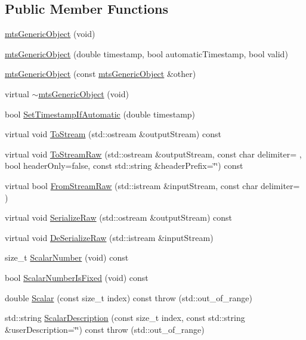 \subsection*{Public Member Functions}
\begin{DoxyCompactItemize}
\item 
\hyperlink{classmts_generic_object_a8db6fa82ec6526194414c4c8bd9dee74}{mts\+Generic\+Object} (void)
\item 
\hyperlink{classmts_generic_object_a70bddbc580e56e7e127263febcad2ed8}{mts\+Generic\+Object} (double timestamp, bool automatic\+Timestamp, bool valid)
\item 
\hyperlink{classmts_generic_object_ade9d524eb6dc7ec1ec2507f91686442c}{mts\+Generic\+Object} (const \hyperlink{classmts_generic_object}{mts\+Generic\+Object} \&other)
\item 
virtual \hyperlink{classmts_generic_object_a1180fc7069c6f241f9be8449d45363d6}{$\sim$mts\+Generic\+Object} (void)
\item 
bool \hyperlink{classmts_generic_object_ad935c5369d451e6ce2ad17a08222bdcc}{Set\+Timestamp\+If\+Automatic} (double timestamp)
\item 
virtual void \hyperlink{classmts_generic_object_a2030aaa58bc215eccce1dc8d20dd0fdc}{To\+Stream} (std\+::ostream \&output\+Stream) const 
\item 
virtual void \hyperlink{classmts_generic_object_a4916a6c62ee5b167d7c93c88ab72523a}{To\+Stream\+Raw} (std\+::ostream \&output\+Stream, const char delimiter= \textquotesingle{} \textquotesingle{}, bool header\+Only=false, const std\+::string \&header\+Prefix=\char`\"{}\char`\"{}) const 
\item 
virtual bool \hyperlink{classmts_generic_object_a975ee040ad3b033df2c4bbdbabc34ed4}{From\+Stream\+Raw} (std\+::istream \&input\+Stream, const char delimiter= \textquotesingle{} \textquotesingle{})
\item 
virtual void \hyperlink{classmts_generic_object_a33d4404a50a87243ca5a1e2b1913dd3b}{Serialize\+Raw} (std\+::ostream \&output\+Stream) const 
\item 
virtual void \hyperlink{classmts_generic_object_af83ae8622a742a5b94bf72e53d20a1cd}{De\+Serialize\+Raw} (std\+::istream \&input\+Stream)
\item 
size\+\_\+t \hyperlink{classmts_generic_object_aa4d6ee134316f5deb7eab2850d1899dc}{Scalar\+Number} (void) const 
\item 
bool \hyperlink{classmts_generic_object_a1b3f1cc0518413adde75adf8241878c5}{Scalar\+Number\+Is\+Fixed} (void) const 
\item 
double \hyperlink{classmts_generic_object_a1c7505fe283dbce64c13463b139119f5}{Scalar} (const size\+\_\+t index) const   throw (std\+::out\+\_\+of\+\_\+range)
\item 
std\+::string \hyperlink{classmts_generic_object_a029201af36af658834041599d250b4f6}{Scalar\+Description} (const size\+\_\+t index, const std\+::string \&user\+Description=\char`\"{}\char`\"{}) const   throw (std\+::out\+\_\+of\+\_\+range)
\end{DoxyCompactItemize}


